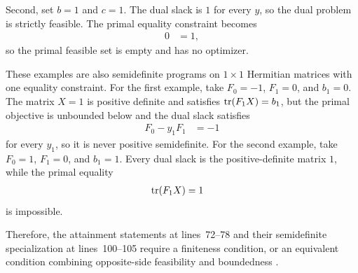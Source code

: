 \documentclass{article}
\begin{document}
Second, set $b=1$ and $c=1$. The dual slack is $1$ for every $y$, so the dual
problem is strictly feasible. The primal equality constraint becomes
\begin{align}
  0
    &=1,
  \label{eq:wolf_slater_attainment_conditions_infeasible_primal_constraint}
\end{align}
so the primal feasible set is empty and has no optimizer.

These examples are also semidefinite programs on $1\times1$ Hermitian
matrices with one equality constraint. For the first example, take
$F_0=-1$, $F_1=0$, and $b_1=0$. The matrix $X=1$ is positive definite and
satisfies $\operatorname{tr}(F_1X)=b_1$, but the primal objective is unbounded below and the
dual slack satisfies
\begin{align}
  F_0-y_1F_1
    &=-1
  \label{eq:wolf_slater_attainment_conditions_negative_dual_slack}
\end{align}
for every $y_1$, so it is never positive semidefinite. For the second example,
take $F_0=1$, $F_1=0$, and $b_1=1$. Every dual slack is the positive-definite
matrix $1$, while the primal equality
\begin{align}
  \operatorname{tr}(F_1X)
    &=1
  \label{eq:wolf_slater_attainment_conditions_impossible_sdp_equality}
\end{align}
is impossible.

Therefore, the attainment statements at lines~72--78 and their semidefinite
specialization at lines~100--105 require a finiteness condition, or an
equivalent condition combining opposite-side feasibility and boundedness
\cite[Chapter~4]{Wolf2012Quantum}.
\end{document}
